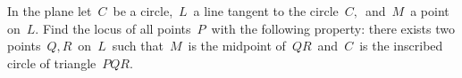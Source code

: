 In the plane let $\,C\,$ be a circle, $\,L\,$ a line tangent to the circle $\,C,\,$ and $\,M\,$ a point on $\,L$. Find the locus of all points $\,P\,$ with the following property: there exists two points $\,Q,R\,$ on $\,L\,$ such that $\,M\,$ is the midpoint of $\,QR\,$ and $\,C\,$ is the inscribed circle of triangle $\,PQR$.